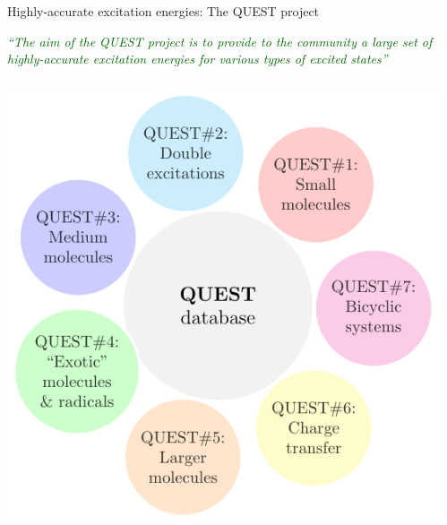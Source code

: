 \documentclass[aspectratio=169,9pt]{beamer}
\newcommand{\green}[1]{\textcolor{darkgreen}{#1}}
\begin{document}
\begin{frame}{Highly-accurate excitation energies: The QUEST project}
    \begin{center}
        \textit{\green{``The aim of the QUEST project is to provide to the community a large set of highly-accurate excitation energies for various types of excited states''}}
    \end{center}
			\vspace{-0.35cm}
        \begin{columns}
                \begin{column}{0.40\textwidth}
                        \includegraphics[width=1.10\textwidth]{fig/QUEST.pdf}
                \end{column}
                \begin{column}{0.40\textwidth}

\end{column}
\end{columns}
\end{frame}
\end{document}

